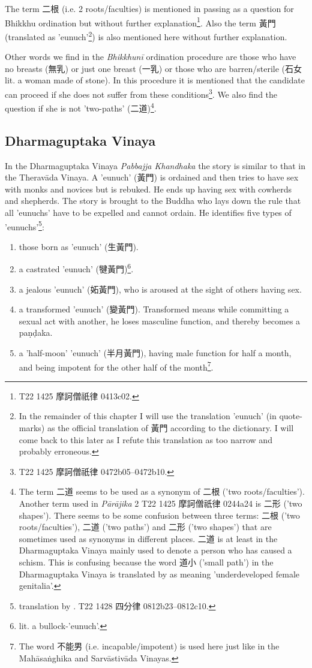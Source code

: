 The term 二根 (i.e. 2 roots/faculties) is mentioned in passing as a question for Bhikkhu ordination but without further explanation\footnote{T22 1425 摩訶僧祇律 0413c02.}. Also the term 黃門 (translated as 'eunuch'\footnote{In the remainder of this chapter I will use the translation 'eunuch' (in quote-marks) as the official translation of 黃門 according to the dictionary. I will come back to this later as I refute this translation as too narrow and probably erroneous.}) is also mentioned here without further explanation.

Other words we find in the {\em Bhikkhunī} ordination procedure are those who have no breasts (無乳) or just one breast (一乳) or those who are barren/sterile (石女 lit. a woman made of stone). In this procedure it is mentioned that the candidate can proceed if she does not suffer from these conditions\footnote{T22 1425 摩訶僧祇律 0472b05–0472b10.}. We also find the question if she is not ’two-paths’ (二道)\footnote{The term 二道 seems to be used as a synonym of 二根 ('two roots/faculties'). Another term used in {\em Pārājika} 2 T22 1425 摩訶僧祇律 0244a24 is 二形 ('two shapes'). There seems to be some confusion between three terms: 二根 ('two roots/faculties'), 二道 ('two paths') and 二形 ('two shapes') that are sometimes used as synonyms in different places. 二道 is at least in the Dharmaguptaka Vinaya mainly used to denote a person who has caused a schism. This is confusing because the word 道小 ('small path') in the Dharmaguptaka Vinaya is translated by \cite{bodhi} as meaning 'underdeveloped female genitalia'.}.

\subsection{Dharmaguptaka Vinaya}
In the Dharmaguptaka Vinaya {\em Pabbajja Khandhaka} the story is similar to that in the Theravāda Vinaya. A 'eunuch' (黃門) is ordained and then tries to have sex with monks and novices but is rebuked. He ends up having sex with cowherds and shepherds. The story is brought to the Buddha who lays down the rule that all 'eunuchs' have to be expelled and cannot ordain. He identifies five types of 'eunuchs'\footnote{translation by \cite{bodhi}. T22 1428 四分律 0812b23–0812c10.}: 

\begin{enumerate}
\item those born as 'eunuch' (生黃門). 
\item a castrated 'eunuch' (犍黃門)\footnote{lit. a bullock-'eunuch'.}.
\item a jealous 'eunuch' (妬黃門), who is aroused at the sight of others having sex.
\item a transformed 'eunuch' (變黃門). Transformed means while committing a sexual act with another, he loses masculine function, and thereby becomes a paṇḍaka.
\item a 'half-moon' 'eunuch' (半月黃門), having male function for half a month, and being impotent for the other half of the month\footnote{The word 不能男 (i.e. incapable/impotent) is used here just like in the Mahāsaṅghika and Sarvāstivāda Vinayas.}.
\end{enumerate}

